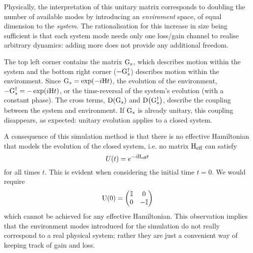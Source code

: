 Physically, the interpretation of this unitary matrix corresponds to doubling
the number of available modes by introducing an \emph{enviroment} space, of
equal dimension to the \emph{system}. The rationalisation for this increase in
size being sufficient is that each system mode needs only one loss/gain channel
to realise arbitrary dynamics: adding more does not provide any additional
freedom.

The top left corner contains the matrix
\(\mathrm{G}_{s}\), which describes motion within the system and the bottom right
corner (\(-\mathrm{G}_{s}^{\dagger}\)) describes motion within the environment.
Since \(\mathrm{G}_{s}=\exp \!\left(-i\mathrm{H}t\right)\), the evolution of the environment,
\(\mathrm{-G}_{s}^{\dagger}=-\exp \!\left(i\mathrm{H}t\right)\), or the time-reversal of the
system's evolution (with a constant phase). The cross terms, \(\mathrm{D}
\!\left(\mathrm{G}_{s}\right)\) and \(\mathrm{D} \!\left(\mathrm{G}_{s}^{
\dagger}\right) \), describe the coupling between the system and environment. If
\(\mathrm{G}_{s}\) is already unitary, this coupling disappears, as expected:
unitary evolution applies to a closed system.

A consequence of this simulation method is that there is no effective
Hamiltonian that models the evolution of the closed system, i.e. no matrix
\(\mathrm{H}_{\text{eff}}\) can satisfy
\begin{equation}
  U\!\left(t\right) = e^{-i\mathrm{H}_{\text{eff}}t}
\end{equation}
for all times \(t\). This is evident when considering the initial time \(t=0\).
We would require
\begin{equation}
  \mathrm{U}\!\left(0\right) = \begin{pmatrix}
    \mathbb{I} & 0 \\
    0 & -\mathbb{I}
  \end{pmatrix}
\end{equation}
which cannot be achieved for any effective Hamiltonian. This observation implies
that the environment modes introduced for the simulation do not really
correspond to a real physical system; rather they are just a convenient way of
keeping track of gain and loss.

